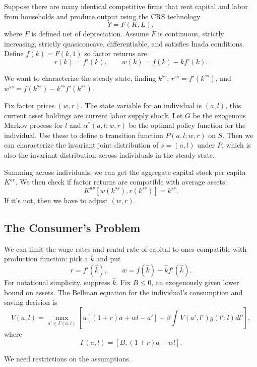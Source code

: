 \documentclass{tufte-handout}
\theoremstyle{definition}
\begin{document}
 Suppose there are many identical competitive firms that rent capital and labor from households and produce output using the CRS technology \[
	Y = F(K,L)
,\] where $F$ is defined net of depreciation. Assume $F$ is continuous, strictly increasing, strictly quasiconcave, differentiable, and satisfies Inada conditions. Define $f(k) = F(k,1)$ so factor returns are \[
	r(k) = f'(k), \qquad w(k) = f(k) - kf'(k)
.\] 

We want to characterize the steady state, finding $k^{ss}$, $r^{ss} = f'(k^{ss})$, and $w^{ss} = f(k^{ss}) - k^{ss} f'(k^{ss})$.

Fix factor prices $(w,r)$. The state variable for an individual is $(a,l)$, this current asset holdings are current labor supply shock. Let $G$ be the exogenous Markov process for $l$ and $\alpha^*(a,l;w,r)$ be the optimal policy function for the individual. Use these to define a transition function $P(a,l;w,r)$ on $S$. 
Then we can characterize the invariant joint distribution of $s=(a,l)$ under $P$, which is also the invariant distribution across individuals in the steady state. 

Summing across individuals, we can get the aggregate capital stock per capita $K^{av}$. We then check if factor returns are compatible with average assets: \[
	K^{av} \left[ w(k^{ss}), r(k^{ss}) \right] = k^{ss}
.\] If it's not, then we have to adjust $(w,r)$.

\subsection{The Consumer's Problem}

We can limit the wage rates and rental rate of capital to ones compatible with production function: pick a $\hat{k}$ and put \[
	r = f'(\hat{k}), \qquad w = f(\hat{k}) - \hat{k} f'(\hat{k})
.\] For notational simplicity, suppress $\hat{k}$. Fix $B \le 0$, an exogenously given lower bound on assets. The Bellman equation for the individual's consumption and saving decision is \[
	V(a,l) = \max_{a' \in \Gamma(a,l)} \left[ u\left[ (1+r)a + wl - a' \right] + \beta \int_{}^{} V(a',l')g(l';l)dl'  \right]
,\] where \[
	\Gamma(a,l) = \left[ B, (1+r)a + wl \right]
.\] 

We need restrictions on the assumptions.
\end{document}
